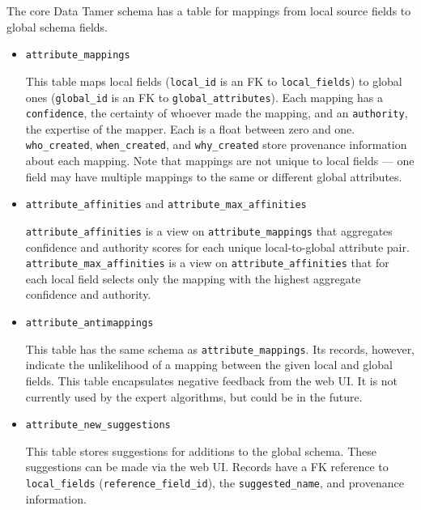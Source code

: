 \documentclass[12pt]{article}
\begin{document}
The core Data Tamer schema has a table for mappings from local source fields to global schema fields.

\begin{itemize}

\item \texttt{attribute\_mappings}

This table maps local fields (\texttt{local\_id} is an FK to \texttt{local\_fields}) to global ones (\texttt{global\_id} is an FK to \texttt{global\_attributes}).  Each mapping has a \texttt{confidence}, the certainty of whoever made the mapping, and an \texttt{authority}, the expertise of the mapper.  Each is a float between zero and one.  \texttt{who\_created}, \texttt{when\_created}, and \texttt{why\_created} store provenance information about each mapping.  Note that mappings are not unique to local fields --- one field may have multiple mappings to the same or different global attributes.

\item \texttt{attribute\_affinities} and \texttt{attribute\_max\_affinities}

\texttt{attribute\_affinities} is a view on \texttt{attribute\_mappings} that aggregates confidence and authority scores for each unique local-to-global attribute pair.  \texttt{attribute\_max\_affinities} is a view on \texttt{attribute\_affinities} that for each local field selects only the mapping with the highest aggregate confidence and authority.

\item \texttt{attribute\_antimappings}

This table has the same schema as \texttt{attribute\_mappings}.  Its records, however, indicate the unlikelihood of a mapping between the given local and global fields.  This table encapsulates negative feedback from the web UI.  It is not currently used by the expert algorithms, but could be in the future.

\item \texttt{attribute\_new\_suggestions}

This table stores suggestions for additions to the global schema.  These suggestions can be made via the web UI.  Records have a FK reference to \texttt{local\_fields} (\texttt{reference\_field\_id}), the \texttt{suggested\_name}, and provenance information.

\end{itemize}
\end{document}
